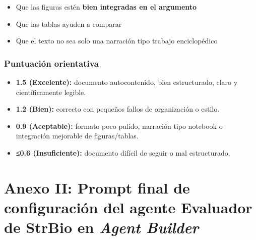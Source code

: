 \documentclass[
  11pt,
  a4paper,
  twoside]{scrreprt}
\begin{document}
\begin{itemize}
\item
  Que las figuras estén \textbf{bien integradas en el argumento}
\item
  Que las tablas ayuden a comparar
\item
  Que el texto no sea solo una narración tipo trabajo enciclopédico
\end{itemize}

\subsubsection{Puntuación
orientativa}\label{puntuaciuxf3n-orientativa-3}

\begin{itemize}
\item
  \textbf{1.5 (Excelente):} documento autocontenido, bien estructurado,
  claro y científicamente legible.
\item
  \textbf{1.2 (Bien):} correcto con pequeños fallos de organización o
  estilo.
\item
  \textbf{0.9 (Aceptable):} formato poco pulido, narración tipo notebook
  o integración mejorable de figuras/tablas.
\item
  \textbf{≤0.6 (Insuficiente):} documento difícil de seguir o mal
  estructurado.
\end{itemize}

\newpage

\section{\texorpdfstring{Anexo II: Prompt final de configuración del
agente \textbf{Evaluador de StrBio} en \emph{Agent
Builder}}{Anexo II: Prompt final de configuración del agente Evaluador de StrBio en Agent Builder}}\label{sec-2anex2}
\end{document}
